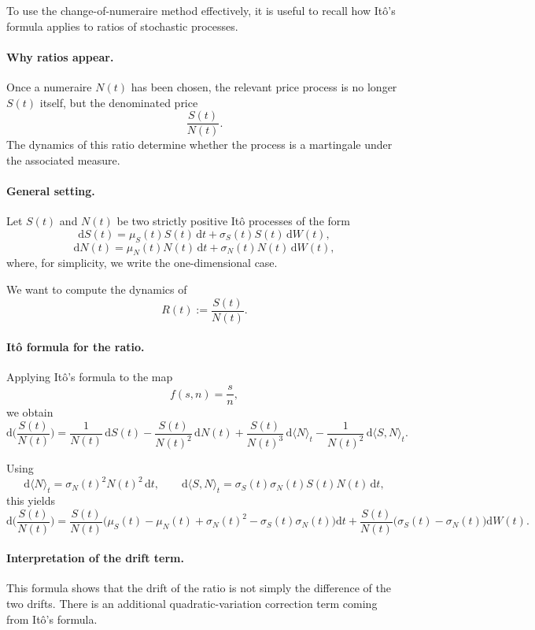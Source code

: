 \documentclass[11pt]{article}
\theoremstyle{definition}
\theoremstyle{plain}
\begin{document}
To use the change-of-numeraire method effectively, it is useful to
recall how It\^o's formula applies to ratios of stochastic processes.

\paragraph{Why ratios appear.}
Once a numeraire \(N(t)\) has been chosen, the relevant price process is
no longer \(S(t)\) itself, but the denominated price
\[
\frac{S(t)}{N(t)}.
\]
The dynamics of this ratio determine whether the process is a martingale
under the associated measure.

\paragraph{General setting.}
Let \(S(t)\) and \(N(t)\) be two strictly positive It\^o processes of the form
\[
\mathrm{d}S(t)=\mu_S(t)S(t)\,\mathrm{d}t+\sigma_S(t)S(t)\,\mathrm{d}W(t),
\]
\[
\mathrm{d}N(t)=\mu_N(t)N(t)\,\mathrm{d}t+\sigma_N(t)N(t)\,\mathrm{d}W(t),
\]
where, for simplicity, we write the one-dimensional case.

We want to compute the dynamics of
\[
R(t):=\frac{S(t)}{N(t)}.
\]

\paragraph{It\^o formula for the ratio.}
Applying It\^o's formula to the map
\[
f(s,n)=\frac{s}{n},
\]
we obtain
\[
\mathrm{d}\Big(\frac{S(t)}{N(t)}\Big)
=
\frac{1}{N(t)}\,\mathrm{d}S(t)
-
\frac{S(t)}{N(t)^2}\,\mathrm{d}N(t)
+
\frac{S(t)}{N(t)^3}\,\mathrm{d}\langle N\rangle_t
-
\frac{1}{N(t)^2}\,\mathrm{d}\langle S,N\rangle_t.
\]

Using
\[
\mathrm{d}\langle N\rangle_t=\sigma_N(t)^2N(t)^2\,\mathrm{d}t,
\qquad
\mathrm{d}\langle S,N\rangle_t=\sigma_S(t)\sigma_N(t)S(t)N(t)\,\mathrm{d}t,
\]
this yields
\[
\mathrm{d}\Big(\frac{S(t)}{N(t)}\Big)
=
\frac{S(t)}{N(t)}
\Big(
\mu_S(t)-\mu_N(t)+\sigma_N(t)^2-\sigma_S(t)\sigma_N(t)
\Big)\mathrm{d}t
+
\frac{S(t)}{N(t)}\big(\sigma_S(t)-\sigma_N(t)\big)\mathrm{d}W(t).
\]

\paragraph{Interpretation of the drift term.}
This formula shows that the drift of the ratio is not simply the
difference of the two drifts.
There is an additional quadratic-variation correction term coming from
It\^o's formula.
\end{document}
